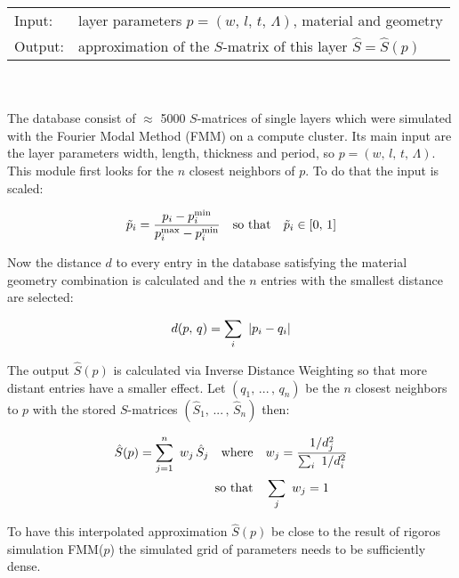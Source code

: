 \begin{tabular}{ll}
    \toprule
    Input: & layer parameters $p = (w, \, l, \, t, \, \Lambda)$, material and geometry \\
    Output: & approximation of the $S$-matrix of this layer $\hat{S} = \hat{S}(p)$\\
    \bottomrule
\end{tabular}
\\
\\
The database consist of $\approx$ 5000 $S$-matrices of single layers which were simulated with the Fourier Modal Method (FMM) on a compute cluster. Its main input are the layer parameters width, length, thickness and period, so $p = (w, \, l, \, t, \, \Lambda)$. This module first looks for the $n$ closest neighbors of $p$. To do that the input is scaled:

\begin{equation}
    \tilde{p}_i = \frac{p_i - p_i^\s{min}}{p_i^\s{max} - p_i^\s{min}}
    \qq{so that} \tilde{p}_i \in [0, \, 1]
\end{equation}

\noindent
Now the distance $d$ to every entry in the database satisfying the material geometry combination is calculated and the $n$ entries with the smallest distance are selected:

\begin{equation}
    d(p, \,q) = \sum_i \ \qty|p_i - q_i|
\end{equation}

\noindent
The output $\hat{S}(p)$ is calculated via Inverse Distance Weighting \cite{Shepard1968} so that more distant entries have a smaller effect. Let
$(q_1, \, ... \, , \, q_n)$ be the $n$ closest neighbors to $p$ with the stored $S$-matrices
$(\hat{S}_1, \, ... \, , \, \hat{S}_n)$
then:

\begin{equation}
\begin{aligned}
    \hat{S}(p) = \sum_{j=1}^n \ w_j \, \hat{S}_j
    \qq{where}& w_j = \frac{1 / d_j^2}{\sum_i \ 1 / d^2_i} \\
    \qq*{so that} &\sum_j \ w_j = 1
\end{aligned}
\end{equation}

\noindent
To have this interpolated approximation $\hat{S}(p)$ be close to the result of rigoros simulation FMM($p$) the simulated grid of parameters needs to be sufficiently dense. 
